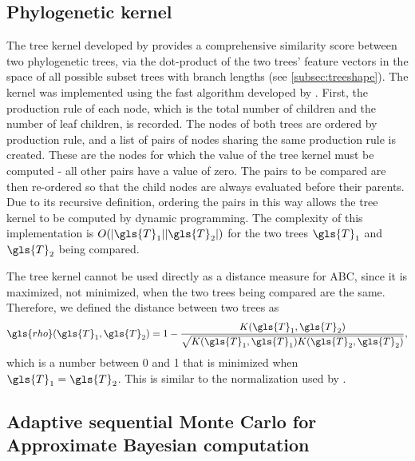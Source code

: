 \subsection{Phylogenetic kernel}

The tree kernel developed by \textcite{poon2013mapping} provides a
comprehensive similarity score between two phylogenetic trees, via the
dot-product of the two trees' feature vectors in the space of all possible
subset trees with branch lengths (see \cref{subsec:treeshape}).  The kernel was
implemented using the fast algorithm developed by
\textcite{moschitti2006making}. First, the production rule of each node, which
is the total number of children and the number of leaf children, is recorded.
The nodes of both trees are ordered by production rule, and a list of pairs of
nodes sharing the same production rule is created. These are the nodes for
which the value of the tree kernel must be computed - all other pairs have a
value of zero. The pairs to be compared are then re-ordered so that the child
nodes are always evaluated before their parents. Due to its recursive
definition, ordering the pairs in this way allows the tree kernel to be
computed by dynamic programming. The complexity of this implementation is
$O(|\gls{T}_1||\gls{T}_2|)$ for the two trees $\gls{T}_1$ and $\gls{T}_2$ being
compared.

The tree kernel cannot be used directly as a distance measure for \gls{ABC},
since it is maximized, not minimized, when the two trees being compared are the
same. Therefore, we defined the distance between two trees as
\[
    \gls{rho}(\gls{T}_1, \gls{T}_2) = 1 - \frac{K(\gls{T}_1, \gls{T}_2)}{\sqrt{K(\gls{T}_1, \gls{T}_1) K(\gls{T}_2, \gls{T}_2)}},
\]
which is a number between 0 and 1 that is minimized when $\gls{T}_1 = \gls{T}_2$. This is
similar to the normalization used by \textcite{collins2002new,
poon2013mapping}.

\subsection{Adaptive sequential Monte Carlo for Approximate Bayesian computation}
\label{subsec:adaptsmc}

